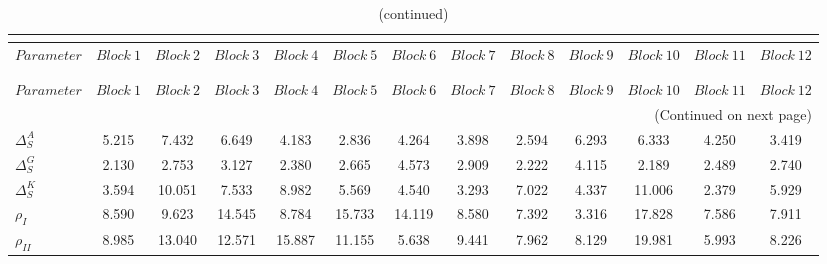  
\begin{center}
\begin{longtable}{lcccccccccccc} 
\caption{MCMC Inefficiency factors per block}\\
 \label{Table:MCMC_inefficiency_factors}\\
\toprule 
$Parameter           $	 & 	 $     Block~1$	 & 	 $     Block~2$	 & 	 $     Block~3$	 & 	 $     Block~4$	 & 	 $     Block~5$	 & 	 $     Block~6$	 & 	 $     Block~7$	 & 	 $     Block~8$	 & 	 $     Block~9$	 & 	 $    Block~10$	 & 	 $    Block~11$	 & 	 $    Block~12$\\
\midrule \endfirsthead 
\caption{(continued)}\\
 \toprule \\ 
$Parameter           $	 & 	 $     Block~1$	 & 	 $     Block~2$	 & 	 $     Block~3$	 & 	 $     Block~4$	 & 	 $     Block~5$	 & 	 $     Block~6$	 & 	 $     Block~7$	 & 	 $     Block~8$	 & 	 $     Block~9$	 & 	 $    Block~10$	 & 	 $    Block~11$	 & 	 $    Block~12$\\
\midrule \endhead 
\midrule \multicolumn{13}{r}{(Continued on next page)} \\ \bottomrule \endfoot 
\bottomrule \endlastfoot 
$ {\Delta^{A}_{S}}   $	 & 	       5.215	 & 	       7.432	 & 	       6.649	 & 	       4.183	 & 	       2.836	 & 	       4.264	 & 	       3.898	 & 	       2.594	 & 	       6.293	 & 	       6.333	 & 	       4.250	 & 	       3.419 \\ 
$ {\Delta^{G}_{S}}   $	 & 	       2.130	 & 	       2.753	 & 	       3.127	 & 	       2.380	 & 	       2.665	 & 	       4.573	 & 	       2.909	 & 	       2.222	 & 	       4.115	 & 	       2.189	 & 	       2.489	 & 	       2.740 \\ 
$ {\Delta^{K}_{S}}   $	 & 	       3.594	 & 	      10.051	 & 	       7.533	 & 	       8.982	 & 	       5.569	 & 	       4.540	 & 	       3.293	 & 	       7.022	 & 	       4.337	 & 	      11.006	 & 	       2.379	 & 	       5.929 \\ 
$ {\rho_{I}}         $	 & 	       8.590	 & 	       9.623	 & 	      14.545	 & 	       8.784	 & 	      15.733	 & 	      14.119	 & 	       8.580	 & 	       7.392	 & 	       3.316	 & 	      17.828	 & 	       7.586	 & 	       7.911 \\ 
$ {\rho_{II}}        $	 & 	       8.985	 & 	      13.040	 & 	      12.571	 & 	      15.887	 & 	      11.155	 & 	       5.638	 & 	       9.441	 & 	       7.962	 & 	       8.129	 & 	      19.981	 & 	       5.993	 & 	       8.226 \\ 

\end{longtable}
\end{center}
